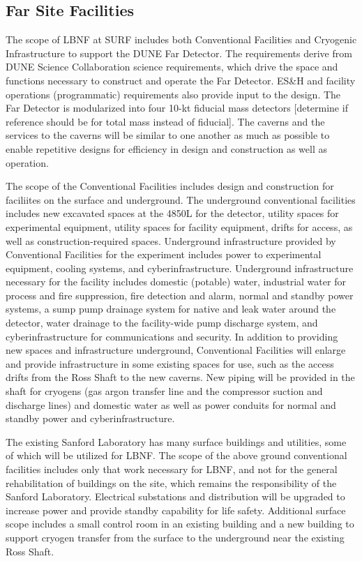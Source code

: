 \subsection{Far Site Facilities}

The scope of LBNF at SURF includes both Conventional Facilities and Cryogenic Infrastructure to support the DUNE Far Detector. The requirements derive from DUNE Science Collaboration science requirements, which drive the space and functions necessary to construct and operate the Far Detector.  ES&H and facility operations (programmatic) requirements also provide input to the design. The Far Detector is modularized into four 10-kt fiducial mass detectors [determine if reference should be for total mass instead of fiducial]. The caverns and the services to the caverns will be similar to one another as much as possible to enable repetitive designs for efficiency in design and construction as well as operation. 

The scope of the Conventional Facilities includes design and construction for faciliites on the surface and underground. The underground conventional facilities includes new excavated spaces at the 4850L for the detector, utility spaces for experimental equipment, utility spaces for facility equipment, drifts for access, as well as construction-required spaces. Underground infrastructure provided by Conventional Facilities for the experiment includes power to experimental equipment, cooling systems, and cyberinfrastructure. Underground infrastructure necessary for the facility includes domestic (potable) water, industrial water for process and fire suppression, fire detection and alarm, normal and standby power systems, a sump pump drainage system for native and leak water around the detector, water drainage to the facility-wide pump discharge system, and cyberinfrastructure for communications and security.
In addition to providing new spaces and infrastructure underground, Conventional Facilities will enlarge and provide infrastructure in some existing spaces for use, such as the access drifts from the Ross Shaft to the new caverns. New piping will be provided in the shaft for cryogens (gas argon transfer line and the compressor suction and discharge lines) and domestic water as well as power conduits for normal and standby power and cyberinfrastructure. 

The existing Sanford Laboratory has many surface buildings and utilities, some of which will be utilized for LBNF. The scope of the above ground conventional facilities includes only that work necessary for LBNF, and not for the general rehabilitation of buildings on the site, which remains the responsibility of the Sanford Laboratory. Electrical substations and distribution will be upgraded to increase power and provide standby capability for life safety. Additional surface scope includes a small control room in an existing building and a new building to support cryogen transfer from the surface to the underground near the existing Ross Shaft.

